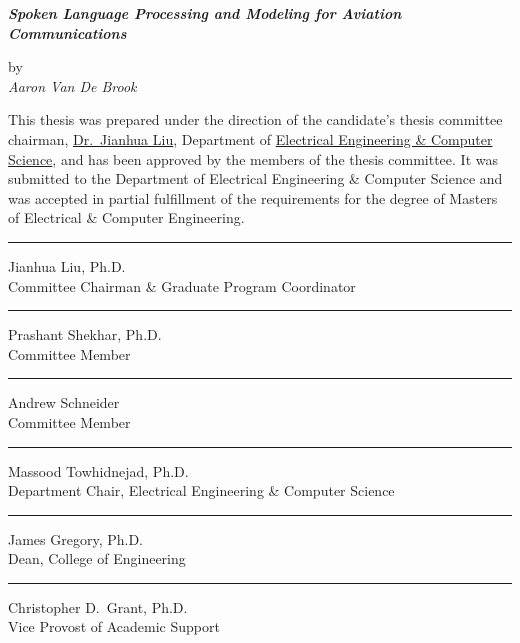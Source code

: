 \documentclass[12pt]{article}
\begin{document}
\begin{center}
    \LARGE
    \textbf{
        \textit{
            Spoken Language Processing and Modeling for Aviation Communications\\
        }
    }

    \vspace*{0.2in}

    \normalsize
    by\\
    \textit{Aaron Van De Brook}\\

    \vspace*{0.25in}

\end{center}
This thesis was prepared under the direction of the candidate's thesis
committee chairman, \underline{Dr.~Jianhua Liu}, Department of \underline{Electrical Engineering \&
    Computer Science}, and has been approved by the members of the thesis committee.
It was submitted to the Department of Electrical Engineering \& Computer Science
and was accepted in partial fulfillment of the requirements for the degree of
Masters of Electrical \& Computer Engineering.

\begin{center}
    \begin{minipage}{4.5in}
        \vspace*{0.35in}
        \hrule
        \vspace*{2pt}
        Jianhua Liu, Ph.D.\\
        Committee Chairman \& Graduate Program Coordinator \\
        \vspace*{0.5in}
        \hrule
        \vspace*{2pt}
        Prashant Shekhar, Ph.D.\\
        Committee Member\\
        \vspace*{0.5in}
        \hrule
        \vspace*{2pt}
        Andrew Schneider\\
        Committee Member\\
        \vspace*{0.5in}
        \hrule
        \vspace*{2pt}
        Massood Towhidnejad, Ph.D.\\
        Department Chair, Electrical Engineering \& Computer Science\\
        \vspace*{0.5in}
        \hrule
        \vspace*{2pt}
        James Gregory, Ph.D.\\
        Dean, College of Engineering\\
        \vspace*{0.5in}
        \hrule
        \vspace*{2pt}
        Christopher D.~Grant, Ph.D.\\
        Vice Provost of Academic Support\\
    \end{minipage}
\end{center}
\newpage
\tableofcontents
\newpage
\doublespacing{}
\end{document}
